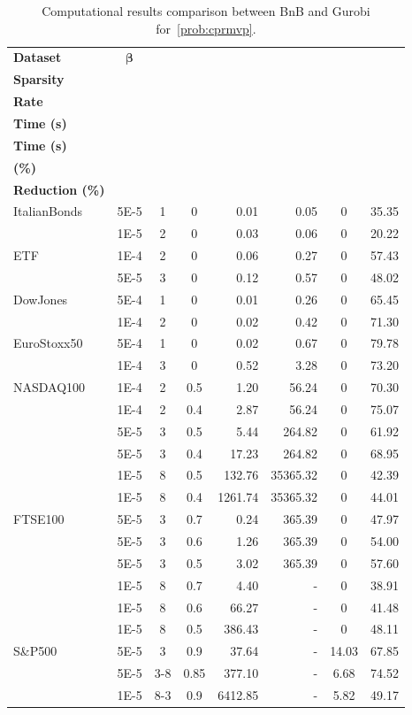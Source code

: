 \documentclass[11pt]{article}
\theoremstyle{plain}
\theoremstyle{definition}
\theoremstyle{plain}
\begin{document}
\begin{table}[!htbp]
\centering
\fontsize{10}{12}\selectfont
\setlength{\tabcolsep}{3.5pt}
\renewcommand{\arraystretch}{0.95}
\caption{Computational results comparison between BnB and Gurobi for~\eqref{prob:cprmvp}.}
\label{tab:results1}
\begin{tabular}{lcccrrcr}
\hline
\textbf{Dataset} & $\boldsymbol{\beta}$ &
\makecell{\textbf{Solution} \\ \textbf{Sparsity}} &
\makecell{\textbf{Drop} \\ \textbf{Rate}} &
\makecell{\textbf{BnB CPU} \\ \textbf{Time (s)}} &
\makecell{\textbf{Gurobi CPU} \\ \textbf{Time (s)}} &
\makecell{\textbf{Error} \\ \textbf{(\%)}} &
\makecell{\textbf{Node} \\ \textbf{Reduction (\%)}} \\
\hline
ItalianBonds & 5E-5 & 1 & 0 & 0.01 & 0.05 & 0 & 35.35 \\
        & 1E-5 & 2 & 0 & 0.03 & 0.06 & 0 & 20.22 \\
ETF     & 1E-4 & 2 & 0 & 0.06 & 0.27 & 0 & 57.43 \\
        & 5E-5 & 3 & 0 & 0.12 & 0.57 & 0 & 48.02 \\
DowJones & 5E-4 & 1 & 0 & 0.01 & 0.26 & 0 & 65.45 \\
        & 1E-4 & 2 & 0 & 0.02 & 0.42 & 0 & 71.30 \\
EuroStoxx50 & 5E-4 & 1 & 0 & 0.02 & 0.67 & 0 & 79.78 \\
        & 1E-4 & 3 & 0 & 0.52 & 3.28 & 0 & 73.20 \\
NASDAQ100 & 1E-4 & 2 & 0.5 & 1.20 & 56.24 & 0 & 70.30 \\
        & 1E-4 & 2 & 0.4 & 2.87 & 56.24 & 0 & 75.07 \\
        & 5E-5 & 3 & 0.5 & 5.44 & 264.82 & 0 & 61.92 \\
        & 5E-5 & 3 & 0.4 & 17.23 & 264.82 & 0 & 68.95 \\
        & 1E-5 & 8 & 0.5 & 132.76 & 35365.32 & 0 & 42.39 \\
        & 1E-5 & 8 & 0.4 & 1261.74 & 35365.32 & 0 & 44.01 \\
FTSE100 & 5E-5 & 3 & 0.7 & 0.24 & 365.39 & 0 & 47.97 \\
        & 5E-5 & 3 & 0.6 & 1.26 & 365.39 & 0 & 54.00 \\
        & 5E-5 & 3 & 0.5 & 3.02 & 365.39 & 0 & 57.60 \\
        & 1E-5 & 8 & 0.7 & 4.40 & - & 0 & 38.91 \\
        & 1E-5 & 8 & 0.6 & 66.27 & - & 0 & 41.48 \\
        & 1E-5 & 8 & 0.5 & 386.43 & - & 0 & 48.11 \\
S\&P500 & 5E-5 & 3 & 0.9 & 37.64 & - & 14.03 & 67.85 \\
        & 5E-5 & 3-8 & 0.85 & 377.10 & - & 6.68 & 74.52 \\
        & 1E-5 & 8-3 & 0.9 & 6412.85 & - & 5.82 & 49.17 \\
\hline
\end{tabular}
\end{table}
\end{document}
